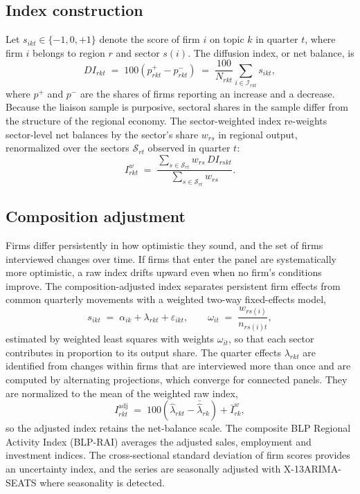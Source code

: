 \documentclass[11pt]{article}
\begin{document}
\subsection{Index construction}
Let $s_{ikt} \in \{-1,0,+1\}$ denote the score of firm $i$ on topic $k$ in quarter $t$, where firm $i$ belongs to region $r$ and sector $s(i)$. The diffusion index, or net balance, is
\begin{equation}\label{eq:di}
DI_{rkt} \;=\; 100\left(p^{+}_{rkt} - p^{-}_{rkt}\right) \;=\; \frac{100}{N_{rkt}} \sum_{i \in \mathcal{I}_{rkt}} s_{ikt},
\end{equation}
where $p^{+}$ and $p^{-}$ are the shares of firms reporting an increase and a decrease. Because the liaison sample is purposive, sectoral shares in the sample differ from the structure of the regional economy. The sector-weighted index re-weights sector-level net balances by the sector's share $w_{rs}$ in regional output, renormalized over the sectors $\mathcal{S}_{rt}$ observed in quarter $t$:
\begin{equation}\label{eq:weighted}
I^{w}_{rkt} \;=\; \frac{\sum_{s \in \mathcal{S}_{rt}} w_{rs}\, DI_{rskt}}{\sum_{s \in \mathcal{S}_{rt}} w_{rs}}.
\end{equation}

\subsection{Composition adjustment}
Firms differ persistently in how optimistic they sound, and the set of firms interviewed changes over time. If firms that enter the panel are systematically more optimistic, a raw index drifts upward even when no firm's conditions improve. The composition-adjusted index separates persistent firm effects from common quarterly movements with a weighted two-way fixed-effects model,
\begin{equation}\label{eq:fe}
s_{ikt} \;=\; \alpha_{ik} + \lambda_{rkt} + \varepsilon_{ikt}, \qquad \omega_{it} \;=\; \frac{w_{r s(i)}}{n_{r s(i) t}},
\end{equation}
estimated by weighted least squares with weights $\omega_{it}$, so that each sector contributes in proportion to its output share. The quarter effects $\lambda_{rkt}$ are identified from changes within firms that are interviewed more than once and are computed by alternating projections, which converge for connected panels. They are normalized to the mean of the weighted raw index,
\begin{equation}\label{eq:norm}
I^{\mathrm{adj}}_{rkt} \;=\; 100\left(\hat{\lambda}_{rkt} - \bar{\hat{\lambda}}_{rk}\right) + \bar{I}^{w}_{rk},
\end{equation}
so the adjusted index retains the net-balance scale. The composite BLP Regional Activity Index (BLP-RAI) averages the adjusted sales, employment and investment indices. The cross-sectional standard deviation of firm scores provides an uncertainty index, and the series are seasonally adjusted with X-13ARIMA-SEATS where seasonality is detected.
\end{document}
